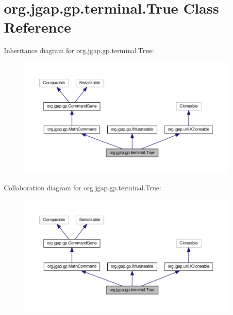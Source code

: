 \hypertarget{classorg_1_1jgap_1_1gp_1_1terminal_1_1_true}{\section{org.\-jgap.\-gp.\-terminal.\-True Class Reference}
\label{classorg_1_1jgap_1_1gp_1_1terminal_1_1_true}
}


Inheritance diagram for org.\-jgap.\-gp.\-terminal.\-True\-:
\nopagebreak
\begin{figure}[H]
\begin{center}
\leavevmode
\includegraphics[width=350pt]{classorg_1_1jgap_1_1gp_1_1terminal_1_1_true__inherit__graph}
\end{center}
\end{figure}


Collaboration diagram for org.\-jgap.\-gp.\-terminal.\-True\-:
\nopagebreak
\begin{figure}[H]
\begin{center}
\leavevmode
\includegraphics[width=350pt]{classorg_1_1jgap_1_1gp_1_1terminal_1_1_true__coll__graph}
\end{center}
\end{figure}
